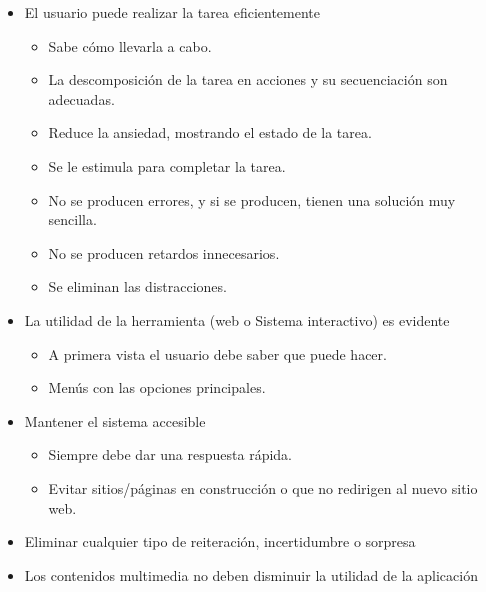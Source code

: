 \documentclass[12pt, twoside, openright]{report} %
\begin{document}
\begin{itemize}
	\item El usuario puede realizar la tarea eficientemente

	      \begin{itemize}
		      \item Sabe cómo llevarla a cabo.

		      \item La descomposición de la tarea en acciones y su secuenciación son
		            adecuadas.

		      \item Reduce la ansiedad, mostrando el estado de la tarea.

		      \item Se le estimula para completar la tarea.

		      \item No se producen errores, y si se producen, tienen una solución
		            muy sencilla.

		      \item No se producen retardos innecesarios.

		      \item Se eliminan las distracciones.
	      \end{itemize}
	\item La utilidad de la herramienta (web o Sistema interactivo) es
	      evidente

	      \begin{itemize}
		      \item A primera vista el usuario debe saber que puede hacer.

		      \item Menús con las opciones principales.
	      \end{itemize}
	\item Mantener el sistema accesible

	      \begin{itemize}
		      \item Siempre debe dar una respuesta rápida.

		      \item Evitar sitios/páginas en construcción o que no redirigen al
		            nuevo sitio web.
	      \end{itemize}
	\item Eliminar cualquier tipo de reiteración, incertidumbre o sorpresa
	\item Los contenidos multimedia no deben disminuir la utilidad de la
	      aplicación


\end{itemize}
\end{document}
